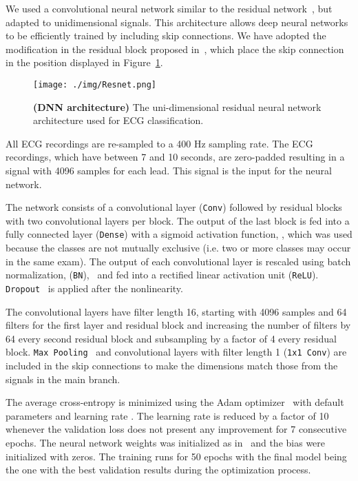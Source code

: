 \documentclass{article}
\begin{document}
We used a convolutional neural network similar to the residual network~\cite{he_deep_2016}, but adapted to unidimensional signals. This architecture allows deep neural networks to be efficiently trained by including skip connections. We have adopted the modification in the  residual block proposed in~\cite{he_identity_2016}, which place the skip connection in the position displayed in Figure~\ref{fig:Resnet}. 

\begin{figure}[ht]
    \centering
	\texttt{[image: ./img/Resnet.png]}
    \caption{\textbf{(DNN architecture)} The uni-dimensional residual neural network architecture used for ECG classification.}
    \label{fig:Resnet}
\end{figure}

All ECG recordings are re-sampled to a 400 Hz sampling rate. The ECG recordings, which have between 7 and 10 seconds, are zero-padded resulting in a signal with 4096 samples for each lead. This signal is the input for the neural network.

The network consists of a convolutional layer (\texttt{Conv})  followed by  residual blocks  with two convolutional layers per block.  The output of the last block is fed into a fully connected layer (\texttt{Dense}) with a sigmoid activation function, , which was used because the classes are not mutually exclusive (i.e. two or more classes may occur in the same exam). The output of each convolutional layer is rescaled using batch normalization, (\texttt{BN}),~\cite{ioffe_batch_2015} and fed into a rectified linear activation unit (\texttt{ReLU}). \texttt{Dropout}~\cite{srivastava_dropout_2014} is applied after the nonlinearity.

The convolutional layers have filter length 16, starting with 4096 samples and 64 filters for the first layer and residual block and increasing the number of filters by 64 every second residual block and subsampling by a factor of 4 every residual block.  \texttt{Max Pooling}~\cite{hutchison_evaluation_2010} and convolutional layers with filter length 1 (\texttt{1x1 Conv}) are included in the skip connections to make the dimensions match those from the signals in the main branch.

The average cross-entropy is minimized using the Adam optimizer~\cite{kingma_adam_2014} with default parameters and learning rate . The learning rate is reduced by a factor of 10 whenever the validation loss does not present any improvement for 7 consecutive epochs. The neural network weights was initialized as in~\cite{he_delving_2015} and the bias were initialized with zeros. The training runs for 50 epochs with the final model being  the one with the best validation results during the optimization process.
\end{document}
